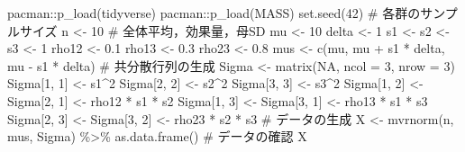 \documentclass[
  a4paper,
]{ltjsbook}
\newenvironment{Shaded}{\begin{snugshade}}{\end{snugshade}}
\newcommand{\AttributeTok}[1]{\textcolor[rgb]{0.40,0.45,0.13}{#1}}
\newcommand{\CommentTok}[1]{\textcolor[rgb]{0.37,0.37,0.37}{#1}}
\newcommand{\ConstantTok}[1]{\textcolor[rgb]{0.56,0.35,0.01}{#1}}
\newcommand{\DecValTok}[1]{\textcolor[rgb]{0.68,0.00,0.00}{#1}}
\newcommand{\FloatTok}[1]{\textcolor[rgb]{0.68,0.00,0.00}{#1}}
\newcommand{\FunctionTok}[1]{\textcolor[rgb]{0.28,0.35,0.67}{#1}}
\newcommand{\NormalTok}[1]{\textcolor[rgb]{0.00,0.23,0.31}{#1}}
\newcommand{\OtherTok}[1]{\textcolor[rgb]{0.00,0.23,0.31}{#1}}
\newcommand{\SpecialCharTok}[1]{\textcolor[rgb]{0.37,0.37,0.37}{#1}}
\begin{document}
\begin{Shaded}
\begin{Highlighting}[]
\NormalTok{pacman}\SpecialCharTok{::}\FunctionTok{p\_load}\NormalTok{(tidyverse)}
\NormalTok{pacman}\SpecialCharTok{::}\FunctionTok{p\_load}\NormalTok{(MASS)}
\FunctionTok{set.seed}\NormalTok{(}\DecValTok{42}\NormalTok{)}
\CommentTok{\# 各群のサンプルサイズ}
\NormalTok{n }\OtherTok{\textless{}{-}} \DecValTok{10}
\CommentTok{\# 全体平均，効果量，母SD}
\NormalTok{mu }\OtherTok{\textless{}{-}} \DecValTok{10}
\NormalTok{delta }\OtherTok{\textless{}{-}} \DecValTok{1}
\NormalTok{s1 }\OtherTok{\textless{}{-}}\NormalTok{ s2 }\OtherTok{\textless{}{-}}\NormalTok{ s3 }\OtherTok{\textless{}{-}} \DecValTok{1}
\NormalTok{rho12 }\OtherTok{\textless{}{-}} \FloatTok{0.1}
\NormalTok{rho13 }\OtherTok{\textless{}{-}} \FloatTok{0.3}
\NormalTok{rho23 }\OtherTok{\textless{}{-}} \FloatTok{0.8}
\NormalTok{mus }\OtherTok{\textless{}{-}} \FunctionTok{c}\NormalTok{(mu, mu }\SpecialCharTok{+}\NormalTok{ s1 }\SpecialCharTok{*}\NormalTok{ delta, mu }\SpecialCharTok{{-}}\NormalTok{ s1 }\SpecialCharTok{*}\NormalTok{ delta)}
\CommentTok{\# 共分散行列の生成}
\NormalTok{Sigma }\OtherTok{\textless{}{-}} \FunctionTok{matrix}\NormalTok{(}\ConstantTok{NA}\NormalTok{, }\AttributeTok{ncol =} \DecValTok{3}\NormalTok{, }\AttributeTok{nrow =} \DecValTok{3}\NormalTok{)}
\NormalTok{Sigma[}\DecValTok{1}\NormalTok{, }\DecValTok{1}\NormalTok{] }\OtherTok{\textless{}{-}}\NormalTok{ s1}\SpecialCharTok{\^{}}\DecValTok{2}
\NormalTok{Sigma[}\DecValTok{2}\NormalTok{, }\DecValTok{2}\NormalTok{] }\OtherTok{\textless{}{-}}\NormalTok{ s2}\SpecialCharTok{\^{}}\DecValTok{2}
\NormalTok{Sigma[}\DecValTok{3}\NormalTok{, }\DecValTok{3}\NormalTok{] }\OtherTok{\textless{}{-}}\NormalTok{ s3}\SpecialCharTok{\^{}}\DecValTok{2}
\NormalTok{Sigma[}\DecValTok{1}\NormalTok{, }\DecValTok{2}\NormalTok{] }\OtherTok{\textless{}{-}}\NormalTok{ Sigma[}\DecValTok{2}\NormalTok{, }\DecValTok{1}\NormalTok{] }\OtherTok{\textless{}{-}}\NormalTok{ rho12 }\SpecialCharTok{*}\NormalTok{ s1 }\SpecialCharTok{*}\NormalTok{ s2}
\NormalTok{Sigma[}\DecValTok{1}\NormalTok{, }\DecValTok{3}\NormalTok{] }\OtherTok{\textless{}{-}}\NormalTok{ Sigma[}\DecValTok{3}\NormalTok{, }\DecValTok{1}\NormalTok{] }\OtherTok{\textless{}{-}}\NormalTok{ rho13 }\SpecialCharTok{*}\NormalTok{ s1 }\SpecialCharTok{*}\NormalTok{ s3}
\NormalTok{Sigma[}\DecValTok{2}\NormalTok{, }\DecValTok{3}\NormalTok{] }\OtherTok{\textless{}{-}}\NormalTok{ Sigma[}\DecValTok{3}\NormalTok{, }\DecValTok{2}\NormalTok{] }\OtherTok{\textless{}{-}}\NormalTok{ rho23 }\SpecialCharTok{*}\NormalTok{ s2 }\SpecialCharTok{*}\NormalTok{ s3}
\CommentTok{\# データの生成}
\NormalTok{X }\OtherTok{\textless{}{-}} \FunctionTok{mvrnorm}\NormalTok{(n, mus, Sigma) }\SpecialCharTok{\%\textgreater{}\%} \FunctionTok{as.data.frame}\NormalTok{()}
\CommentTok{\# データの確認}
\NormalTok{X}
\end{Highlighting}
\end{Shaded}
\end{document}
